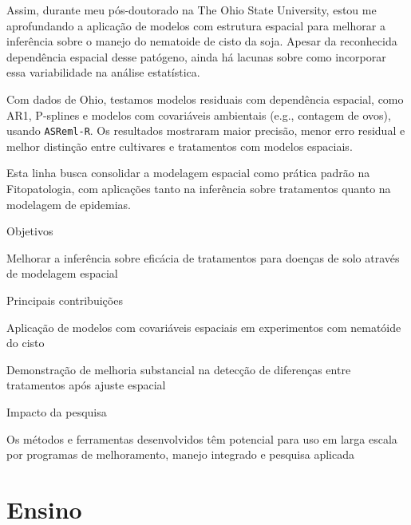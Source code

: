 \documentclass[12pt,a4paper,oneside]{book}
\newcommand{\OSU}{The Ohio State University}
\begin{document}
Assim, durante meu pós-doutorado na \OSU{}, estou me aprofundando a aplicação de modelos com estrutura espacial para 
melhorar a inferência sobre o manejo do nematoide de cisto da soja. Apesar da reconhecida dependência espacial
desse patógeno, ainda há lacunas sobre como incorporar essa variabilidade na análise estatística.

Com dados de Ohio, testamos modelos residuais com dependência espacial, como AR1, P-splines e modelos com 
covariáveis ambientais (e.g., contagem de ovos), usando \texttt{ASReml-R}. Os resultados mostraram maior
precisão, menor erro residual e melhor distinção entre cultivares e tratamentos com modelos espaciais.

Esta linha busca consolidar a modelagem espacial como prática padrão na Fitopatologia, com aplicações 
tanto na inferência sobre tratamentos quanto na modelagem de epidemias.

\begin{fancyenum}{\faBullseye}{Objetivos}
\item Melhorar a inferência sobre eficácia de tratamentos para doenças de solo através de modelagem espacial
\end{fancyenum}

\begin{fancyenum}{\faLightbulb}{Principais contribuições}
\item Aplicação de modelos com covariáveis espaciais em experimentos com nematóide do cisto
\item Demonstração de melhoria substancial na detecção de diferenças entre tratamentos após ajuste espacial
\end{fancyenum}

\begin{fancyenum}{\faRocket}{Impacto da pesquisa}
\item Os métodos e ferramentas desenvolvidos têm potencial para uso em larga 
escala por programas de melhoramento, manejo integrado e pesquisa aplicada
\end{fancyenum}


  \chapter{Ensino}
\label{cap_ensino}
\end{document}
